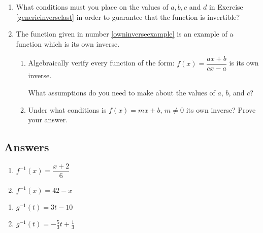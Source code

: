 \begin{enumerate}
\setcounter{enumi}{\value{HW}}

\item \label{whatconditions} What conditions must you place on the values of $a, b, c$ and $d$ in Exercise \ref{genericinverselast} in order to guarantee that the function is invertible?


\item  The function given in number \ref{owninverseexample} is an example of a function which is its own inverse.  

\begin{enumerate}

\item Algebraically verify every function of the form: $f(x) = \dfrac{ax + b}{cx - a}$ is its own inverse.  

What assumptions do you need to make about the values of  $a$, $b$, and $c$?

\item  Under what conditions is $f(x) = mx + b$, $m \neq 0$ its own inverse?  Prove your answer.

\end{enumerate}
\setcounter{HW}{\value{enumi}}
\end{enumerate}

\newpage

\subsection{Answers}

\begin{multicols}{2}
\begin{enumerate}
\addtocounter{enumi}{8}

\item $f^{-1}(x) = \dfrac{x + 2}{6}$
\item $f^{-1}(x) = 42-x$

\setcounter{HW}{\value{enumi}}
\end{enumerate}
\end{multicols}

\begin{multicols}{2}
\begin{enumerate}
\setcounter{enumi}{\value{HW}}

\item  $g^{-1}(t) = 3t-10$
\item $g^{-1}(t)  = -\frac{5}{3} t + \frac{1}{3}$


\setcounter{HW}{\value{enumi}}
\end{enumerate}
\end{multicols}

